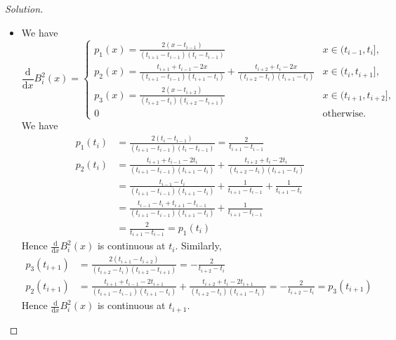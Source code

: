 \documentclass[a4paper]{ctexart}
\begin{document}
\begin{proof}[Solution]
\begin{itemize}
		\item We have
		      \begin{equation}
			      \frac{\text{d}}{\text{d}x}B_i^2(x)=\left\{ \begin{array}{ll}
				      p_1(x)=\frac{2(x-t_{i-1})}{(t_{i+1}-t_{i-1})(t_i-t_{i-1})}                                                             & x\in(t_{i-1},t_i],     \\
				      p_2(x)=\frac{t_{i+1}+t_{i-1}-2x}{(t_{i+1}-t_{i-1})(t_{i+1}-t_i)}+\frac{t_{i+2}+t_i-2x}{(t_{i+2}-t_{i})(t_{i+1}-t_{i})} & x\in(t_i,t_{i+1}],     \\
				      p_3(x)=\frac{2(x-t_{i+2})}{(t_{i+2}-t_{i})(t_{i+2}-t_{i+1})}                                                           & x\in(t_{i+1},t_{i+2}], \\
				      0                                                                                                                      & \text{otherwise}.
			      \end{array} \right.
		      \end{equation}
		      We have
		      \begin{align*}
			      p_1(t_i) & =\frac{2(t_i-t_{i-1})}{(t_{i+1}-t_{i-1})(t_i-t_{i-1})}=\frac{2}{t_{i+1}-t_{i-1}}                                     \\
			      p_2(t_i) & =\frac{t_{i+1}+t_{i-1}-2t_i}{(t_{i+1}-t_{i-1})(t_{i+1}-t_i)}+\frac{t_{i+2}+t_i-2t_i}{(t_{i+2}-t_{i})(t_{i+1}-t_{i})} \\
			               & =\frac{t_{i-1}-t_i}{(t_{i+1}-t_{i-1})(t_{i+1}-t_i)}+\frac{1}{t_{i+1}-t_{i-1}}+\frac{1}{t_{i+1}-t_{i}}                \\
			               & =\frac{t_{i-1}-t_i+t_{i+1}-t_{i-1}}{(t_{i+1}-t_{i-1})(t_{i+1}-t_i)}+\frac{1}{t_{i+1}-t_{i-1}}                        \\
			               & =\frac{2}{t_{i+1}-t_{i-1}} = p_1(t_i)
		      \end{align*}
		      Hence $\frac{\text{d}}{\text{d}x}B_i^2(x)$ is continuous at $t_i$. Similarly,
		      \begin{align*}
			      p_3(t_{i+1}) & =\frac{2(t_{i+1}-t_{i+2})}{(t_{i+2}-t_{i})(t_{i+2}-t_{i+1})}=-\frac{2}{t_{i+2}-t_{i}}                                                                              \\
			      p_2(t_{i+1}) & =\frac{t_{i+1}+t_{i-1}-2t_{i+1}}{(t_{i+1}-t_{i-1})(t_{i+1}-t_i)}+\frac{t_{i+2}+t_i-2t_{i+1}}{(t_{i+2}-t_{i})(t_{i+1}-t_{i})}=-\frac{2}{t_{i+2}-t_{i}}=p_3(t_{i+1})
		      \end{align*}
		      Hence $\frac{\text{d}}{\text{d}x}B_i^2(x)$ is continuous at $t_{i+1}$.


\end{itemize}
\end{proof}
\end{document}
